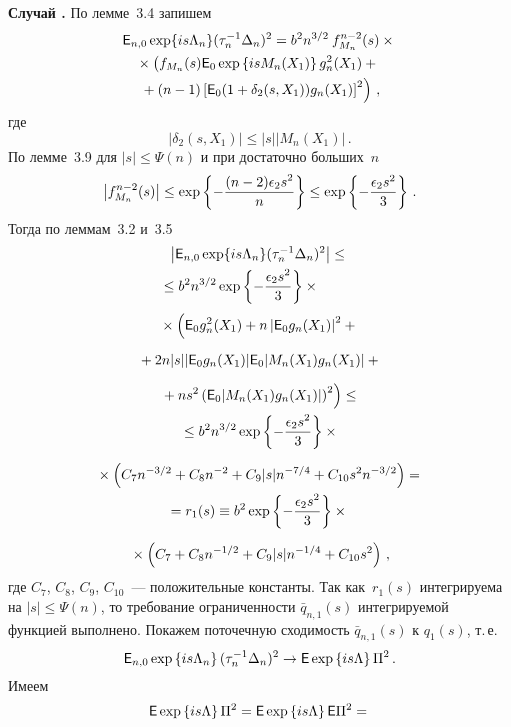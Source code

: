 \begin{multicols}{2}
\medskip

\noindent
\textbf{Случай {}.} По лемме~3.4 запишем
\begin{multline*}
{{\sf E}}_{n,0}\exp\{is\Lambda_n\}(\tau_n^{-1}\Delta_n)^2 = b^2 n^{3/2}\:f_{M_n}^{n-2}(s) \times{}\\
{}
\times \left(f_{M_n}(s) {{\sf E}}_0 \exp\left\{isM_n(X_1)\right\} g_n^2(X_1) + {}\right.{}\\
\left.{}+
(n-1) \left[{{\sf E}}_0 (1+\delta_2(s,X_1)) g_n(X_1)\right]^2\right)\,,
\end{multline*}
где
$$
|\delta_2(s,X_1)| \leq |s| |M_n(X_1)|\,.
$$
По лемме~3.9 для $|s| \leq \Psi(n)$ и при достаточно больших~$n$
$$
\left|f_{M_n}^{n-2}(s)\right| \leq \exp\left\{
-\displaystyle\frac{\displaystyle (n-2)\epsilon_2 s^2\mathstrut}{\displaystyle n\mathstrut}\right\} 
\leq \exp\left\{-\frac{\epsilon_2 s^2}{3}\right\}\,.
$$
Тогда по леммам~3.2 и~3.5
\begin{multline*}
\left|{\e}_{n,0}\exp\{is\Lambda_n\}(\tau_n^{-1}\Delta_n)^2\right| \leq{}\\
{}\leq b^2 n^{3/2} 
\exp\left\{-\fr{\epsilon_2 s^2}{3}\right\} \times{}\hspace*{10mm}
\end{multline*}
\begin{multline*}
{}\times \left({{\sf E}}_0 g_n^2(X_1) + n\left|{{\sf E}}_0g_n(X_1)\right|^2 +{}\right.\\[6pt]
{}
+ 2 n |s|  |{{\sf E}}_0 g_n(X_1)|  {{\sf E}}_0 |M_n(X_1) g_n(X_1)| +{}\\[6pt]
\left.{}+ns^2 \left({{\sf E}}_0 |M_n(X_1) g_n(X_1)|\right)^2\right) \leq
{}\\
{}
\leq b^2 n^{3/2}\exp\left\{-\displaystyle\frac{\displaystyle \epsilon_2 s^2\mathstrut}{\displaystyle 3\mathstrut}\right\} \times{}\\[6pt]
{}\times
\left(C_7n^{-3/2} + C_8n^{-2} + C_9|s|n^{-7/4} + C_{10}s^2n^{-3/2}\right) ={}
\\
= r_1(s) \equiv b^2 \exp\left\{-\displaystyle\frac{\displaystyle \epsilon_2 s^2\mathstrut}{\displaystyle 3\mathstrut}\right\} \times{}\\[6pt]
{}\times
\left(C_7 + C_8n^{-1/2} + C_9|s|n^{-1/4} + C_{10}s^2\right)\,,
\end{multline*}
где $C_7$, $C_8$, $C_9$, $C_{10}$~--- положительные константы. Так как~$r_1(s)$ 
интегрируема на $|s| \leq \Psi(n)$, то требование
ограниченности $\bar{q}_{n,1}(s)$ интегрируемой функцией выполнено.
Покажем поточечную сходимость $\bar{q}_{n,1}(s)$ к $q_1(s)$, т.\,е.
$$
{{\sf E}}_{n,0} \exp\left\{is\Lambda_n\right\} (\tau_n^{-1} \Delta_n)^2 \to {{\sf E}} \exp\left\{is\Lambda\right\} \Pi^2\,.
$$
Имеем
\begin{multline*}
{\e} \exp\left\{is\Lambda\right\} \Pi^2 = {\e} \exp\left\{is\Lambda\right\} {\e} \Pi^2 ={}\\[6pt]

\end{multline*}
\end{multicols}
